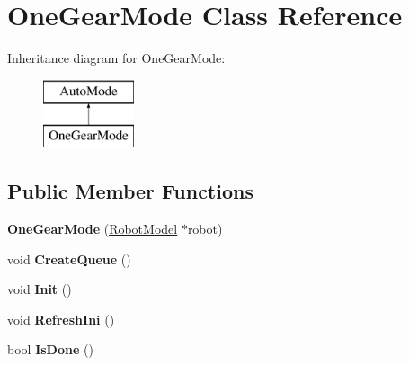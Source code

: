 \hypertarget{class_one_gear_mode}{}\section{One\+Gear\+Mode Class Reference}
\label{class_one_gear_mode}
Inheritance diagram for One\+Gear\+Mode\+:\begin{figure}[H]
\begin{center}
\leavevmode
\includegraphics[height=2.000000cm]{class_one_gear_mode}
\end{center}
\end{figure}
\subsection*{Public Member Functions}
\begin{DoxyCompactItemize}
\item 
\mbox{\label{class_one_gear_mode_a358df92af1a31ceea511aa75b2bff393}} 
{\bfseries One\+Gear\+Mode} (\hyperlink{class_robot_model}{Robot\+Model} $\ast$robot)
\item 
\mbox{\label{class_one_gear_mode_a496910af844fa979cd7d879831dbb609}} 
void {\bfseries Create\+Queue} ()
\item 
\mbox{\label{class_one_gear_mode_a6e4583155a7f2c96f19e937d1315bdf8}} 
void {\bfseries Init} ()
\item 
\mbox{\label{class_one_gear_mode_a1aff75538d9985927fd0f10536b66aec}} 
void {\bfseries Refresh\+Ini} ()
\item 
\mbox{\label{class_one_gear_mode_abbb66b39f2525f4de3d8cc0096d685a0}} 
bool {\bfseries Is\+Done} ()
\end{DoxyCompactItemize}
